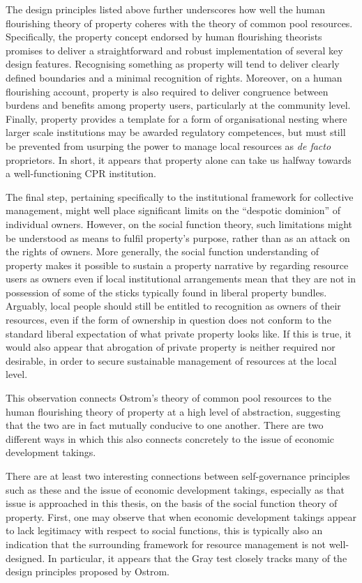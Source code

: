 {The design principles listed above further underscores how well the human flourishing theory of property coheres with the theory of common pool resources. Specifically, the property concept endorsed by human flourishing theorists promises to deliver a straightforward and robust implementation of several key design features. Recognising something as property will tend to deliver clearly defined boundaries and a minimal recognition of rights. Moreover, on a human flourishing account, property is also required to deliver congruence between burdens and benefits among property users, particularly at the community level. Finally, property provides a template for a form of organisational nesting where larger scale institutions may be awarded regulatory competences, but must still be prevented from usurping the power to manage local resources as {\it de facto} proprietors. In short, it appears that property alone can take us halfway towards a well-functioning CPR institution.

The final step, pertaining specifically to the institutional framework for collective management, might well place significant limits on the ``despotic dominion'' of individual owners. However, on the social function theory, such limitations might be understood as means to fulfil property's purpose, rather than as an attack on the rights of owners. More generally, the social function understanding of property makes it possible to sustain a property narrative by regarding resource users as owners even if local institutional arrangements mean that they are not in possession of some of the sticks typically found in liberal property bundles. Arguably, local people should still be entitled to recognition as owners of their resources, even if the form of ownership in question does not conform to the standard liberal expectation of what private property looks like. If this is true, it would also appear that abrogation of private property is neither required nor desirable, in order to secure sustainable management of resources at the local level.


This observation connects Ostrom's theory of common pool resources to the human flourishing theory of property at a high level of abstraction, suggesting that the two are in fact mutually conducive to one another. There are two different ways in which this also connects concretely to the issue of economic development takings.} 
There are at least two interesting connections between self-governance principles such as these and the issue of economic development takings, especially as that issue is approached in this thesis, on the basis of the social function theory of property. First, one may observe that when economic development takings appear to lack legitimacy with respect to social functions, this is typically also an indication that the surrounding framework for resource management is not well-designed. In particular, it appears that the Gray test closely tracks many of the design principles proposed by Ostrom.

